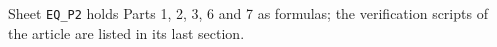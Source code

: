 Sheet \texttt{EQ\_P2} holds Parts 1, 2, 3, 6 and 7 as formulas; the verification scripts of the article are listed in its last section.

